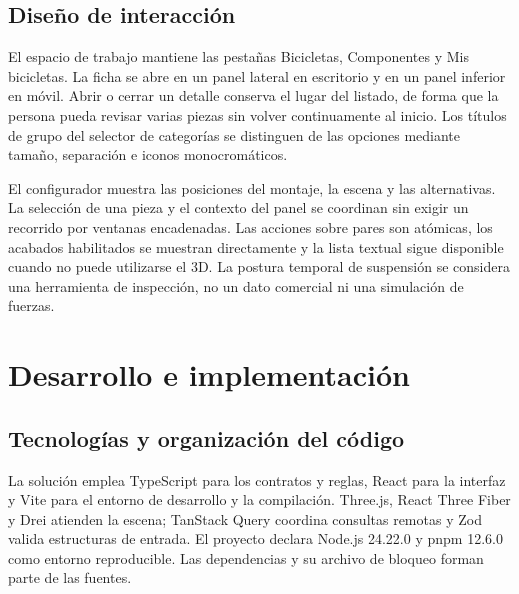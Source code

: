 \documentclass[12pt,letterpaper]{article}
\newcommand{\pagina}{\clearpage}
\begin{document}
\subsection{Diseño de interacción}
El espacio de trabajo mantiene las pestañas Bicicletas, Componentes y Mis bicicletas. La ficha se abre en un panel lateral en escritorio y en un panel inferior en móvil. Abrir o cerrar un detalle conserva el lugar del listado, de forma que la persona pueda revisar varias piezas sin volver continuamente al inicio. Los títulos de grupo del selector de categorías se distinguen de las opciones mediante tamaño, separación e iconos monocromáticos.

El configurador muestra las posiciones del montaje, la escena y las alternativas. La selección de una pieza y el contexto del panel se coordinan sin exigir un recorrido por ventanas encadenadas. Las acciones sobre pares son atómicas, los acabados habilitados se muestran directamente y la lista textual sigue disponible cuando no puede utilizarse el 3D. La postura temporal de suspensión se considera una herramienta de inspección, no un dato comercial ni una simulación de fuerzas.


\pagina

\section{Desarrollo e implementación}
\subsection{Tecnologías y organización del código}
La solución emplea TypeScript para los contratos y reglas, React para la interfaz y Vite para el entorno de desarrollo y la compilación. Three.js, React Three Fiber y Drei atienden la escena; TanStack Query coordina consultas remotas y Zod valida estructuras de entrada. El proyecto declara Node.js 24.22.0 y pnpm 12.6.0 como entorno reproducible. Las dependencias y su archivo de bloqueo forman parte de las fuentes.
\end{document}
